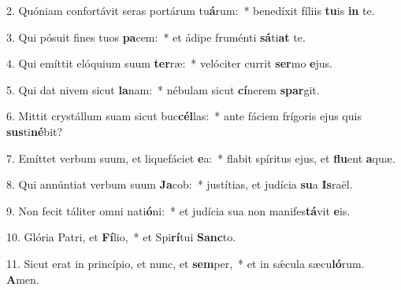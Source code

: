 2. Quóniam confortávit seras portárum tu\textbf{á}rum:~*  benedíxit fíliis \textbf{tu}is \textbf{in} te.\

3. Qui pósuit fines tuos \textbf{pa}cem:~*  et ádipe fruménti \textbf{sá}ti\textbf{at} te.\

4. Qui emíttit elóquium suum \textbf{ter}ræ:~*  velóciter currit \textbf{ser}mo \textbf{e}jus.\

5. Qui dat nivem sicut \textbf{la}nam:~*  nébulam sicut \textbf{cí}nerem \textbf{spar}git.\

6. Mittit crystállum suam sicut buc\textbf{cél}las:~*  ante fáciem frígoris ejus quis \textbf{sus}ti\textbf{né}bit?\

7. Emíttet verbum suum, et liquefáciet \textbf{e}a:~*  flabit spíritus ejus, et \textbf{flu}ent \textbf{a}quæ.\

8. Qui annúntiat verbum suum \textbf{Ja}cob:~*  justítias, et judícia \textbf{su}a \textbf{Is}raël.\

9. Non fecit táliter omni nati\textbf{ó}ni:~*  et judícia sua non manifes\textbf{tá}vit \textbf{e}is.\

10. Glória Patri, et \textbf{Fí}lio,~*  et Spi\textbf{rí}tui \textbf{Sanc}to.\

11. Sicut erat in princípio, et nunc, et \textbf{sem}per,~*  et in sǽcula sæcu\textbf{ló}rum. \textbf{A}men.\

